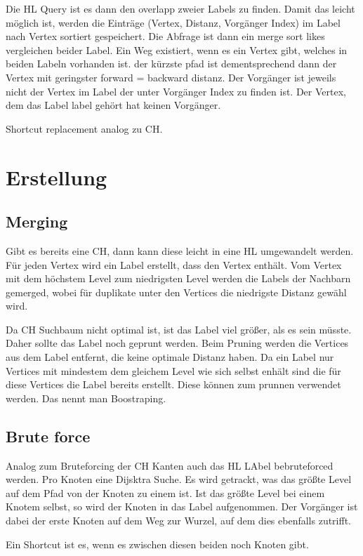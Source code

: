 Die HL Query ist es dann den overlapp zweier Labels zu finden.
Damit das leicht möglich ist, werden die Einträge (Vertex, Distanz, Vorgänger Index) im Label nach Vertex sortiert gespeichert.
Die Abfrage ist dann ein merge sort likes vergleichen beider Label. Ein Weg existiert, wenn es ein Vertex gibt, welches in beiden Labeln vorhanden ist.
der kürzste pfad ist dementsprechend dann der Vertex mit geringster forward = backward distanz.
Der Vorgänger ist jeweils nicht der Vertex im Label der unter Vorgänger Index zu finden ist. Der Vertex, dem das Label label gehört hat keinen Vorgänger.

Shortcut replacement analog zu CH.

\section{Erstellung}

\subsection{Merging}
Gibt es bereits eine CH, dann kann diese leicht in eine HL umgewandelt werden.
Für jeden Vertex wird ein Label erstellt, dass den Vertex enthält.
Vom Vertex mit dem höchstem Level zum niedrigsten Level werden die Labels der Nachbarn gemerged, wobei für duplikate unter den Vertices die niedrigste Distanz gewähl wird.

Da CH Suchbaum nicht optimal ist, ist das Label viel größer, als es sein müsste. Daher sollte das Label noch geprunt werden.
Beim Pruning werden die Vertices aus dem Label entfernt, die keine optimale Distanz haben.
Da ein Label nur Vertices mit mindestem dem gleichem Level wie sich selbst enhält sind die für diese Vertices die Label bereits erstellt.
Diese können zum prunnen verwendet werden.
Das nennt man Boostraping.

\subsection{Brute force}

Analog zum Bruteforcing der CH Kanten auch das HL LAbel bebruteforced werden.
Pro Knoten eine Dijsktra Suche.
Es wird getrackt, was das größte Level auf dem Pfad von der Knoten zu einem ist.
Ist das größte Level bei einem Knotem selbst, so wird der Knoten in das Label aufgenommen.
Der Vorgänger ist dabei der erste Knoten auf dem Weg zur Wurzel, auf dem dies ebenfalls zutrifft.

Ein Shortcut ist es, wenn es zwischen diesen beiden noch Knoten gibt.